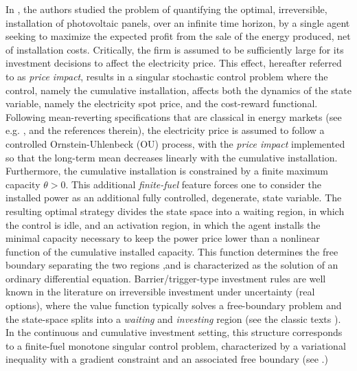 \documentclass[10pt]{article}
\numberwithin{equation}{section}
\theoremstyle{plain}
\numberwithin{theorem}{section}
\theoremstyle{definition}
\newcommand{\<}{\langle}
\renewcommand{\>}{\rangle}
\renewcommand{\(}{\left(}
\renewcommand{\)}{\right)}
\begin{document}
{In \cite{MR4305783}, the authors studied the problem of quantifying the optimal, irreversible, installation of photovoltaic panels, over an infinite time horizon, by a single agent seeking to maximize the expected profit from the sale of the energy produced, net of installation costs. Critically, the firm is assumed to be sufficiently large for its investment decisions to affect the electricity price. This effect, hereafter referred to as \emph{price impact}, results in a singular stochastic control problem where the control, namely the cumulative installation, affects both the dynamics of the state variable, namely the electricity spot price, and the cost-reward functional. Following mean-reverting specifications that are classical in energy markets (see e.g. \cite{Cartea2005}, \cite{Benth2008} and the references therein), the electricity  price is assumed to follow a controlled Ornstein-Uhlenbeck (OU) process, with the \textit{price impact} implemented so that the long-term mean decreases linearly with the cumulative installation.  
Furthermore, the cumulative installation is constrained by a finite maximum capacity $\theta>0$. %
This additional \emph{finite-fuel} feature forces one to consider the installed power as an additional fully controlled, degenerate, state variable. 
The resulting optimal strategy divides the state space into a waiting region, in which the control is idle, and an activation region, in which the agent installs the minimal capacity necessary to keep the power price lower than a nonlinear function of the cumulative installed capacity. This function determines the free boundary separating the two regions ,and is characterized as the solution of an ordinary differential equation. %
Barrier/trigger-type investment rules are well known in the literature on irreversible investment under uncertainty (real options), where the value function typically solves a free-boundary problem and the state-space splits into a \textit{waiting} and \textit{investing} region (see the classic texts \cite{Dixit1994, MR2898980}). In the continuous and cumulative investment setting, this structure corresponds to a finite-fuel monotone singular control problem, characterized by a variational inequality with a gradient constraint and an associated free boundary (see \cite{MR698818, MR762624, MR653144, MR2179357}.)

}
\end{document}
